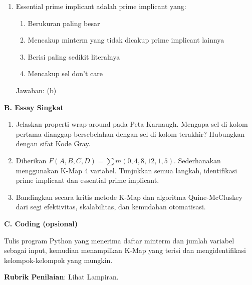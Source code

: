 \documentclass[../main]{subfiles}
\begin{document}
\begin{asesmen}
\begin{enumerate}
  \item Essential prime implicant adalah prime implicant yang:
  \begin{enumerate}
    \item Berukuran paling besar
    \item Mencakup minterm yang tidak dicakup prime implicant lainnya
    \item Berisi paling sedikit literalnya
    \item Mencakup sel don't care
  \end{enumerate}
  Jawaban: (b)
\end{enumerate}

\textbf{B. Essay Singkat}
\begin{enumerate}
  \item Jelaskan properti wrap-around pada Peta Karnaugh. Mengapa sel di kolom pertama dianggap bersebelahan dengan sel di kolom terakhir? Hubungkan dengan sifat Kode Gray.
  \item Diberikan $F(A,B,C,D) = \sum m(0, 4, 8, 12, 1, 5)$. Sederhanakan menggunakan K-Map 4 variabel. Tunjukkan semua langkah, identifikasi prime implicant dan essential prime implicant.
  \item Bandingkan secara kritis metode K-Map dan algoritma Quine-McCluskey dari segi efektivitas, skalabilitas, dan kemudahan otomatisasi.
\end{enumerate}

\textbf{C. Coding (opsional)}

Tulis program Python yang menerima daftar minterm dan jumlah variabel sebagai input, kemudian menampilkan K-Map yang terisi dan mengidentifikasi kelompok-kelompok yang mungkin.

\textbf{Rubrik Penilaian}: Lihat Lampiran.
\end{asesmen}

\end{document}
